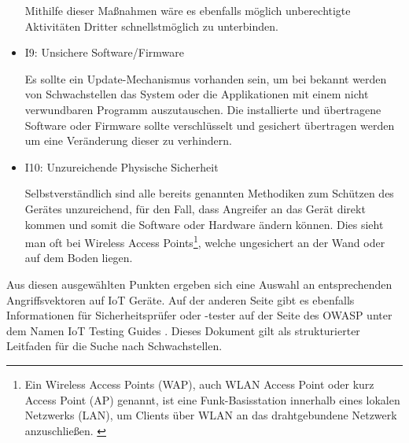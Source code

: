 \begin{itemize}
            Mithilfe dieser Maßnahmen wäre es ebenfalls möglich unberechtigte Aktivitäten Dritter schnellstmöglich zu unterbinden.
            
            \item I9: Unsichere Software/Firmware
            
            Es sollte ein Update-Mechanismus vorhanden sein, um bei bekannt werden von Schwachstellen das System oder die Applikationen mit einem nicht verwundbaren Programm auszutauschen. 
            Die installierte und übertragene Software oder Firmware sollte verschlüsselt und gesichert übertragen werden um eine Veränderung dieser zu verhindern.
            
            \item I10: Unzureichende Physische Sicherheit
            
            Selbstverständlich sind alle bereits genannten Methodiken zum Schützen des Gerätes unzureichend, für den Fall, dass Angreifer an das Gerät direkt kommen und somit die Software oder Hardware ändern können. Dies sieht man oft bei Wireless Access Points\footnote{\glqq Ein Wireless Access Points (WAP), auch WLAN Access Point oder kurz Access Point (AP) genannt, ist eine Funk-Basisstation innerhalb eines lokalen Netzwerks (LAN), um Clients über WLAN an das drahtgebundene Netzwerk anzuschließen.\grqq{} \cite{elektronik_kompendium_2018}}, welche ungesichert an der Wand oder auf dem Boden liegen.
        \end{itemize}
        
        Aus diesen ausgewählten Punkten ergeben sich eine Auswahl an entsprechenden Angriffsvektoren auf \ac{IoT} Geräte. Auf der anderen Seite gibt es ebenfalls Informationen für Sicherheitsprüfer oder -tester auf der Seite des \ac{OWASP} unter dem Namen \glqq IoT Testing Guides\grqq{} \cite{smith_2016}. Dieses Dokument gilt als strukturierter Leitfaden für die Suche nach Schwachstellen.
        

